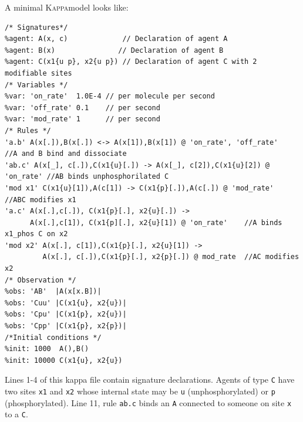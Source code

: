 \documentclass[11pt]{book}
\def\Kappa{\textsc{Kappa}}
\def\ttt#1{\texttt{#1}}
\begin{document}
A minimal \Kappa model looks like:




\begin{lstlisting}[language=kappa]
/* Signatures*/
%agent: A(x, c)             // Declaration of agent A
%agent: B(x)               // Declaration of agent B
%agent: C(x1{u p}, x2{u p}) // Declaration of agent C with 2 modifiable sites
/* Variables */
%var: 'on_rate'  1.0E-4 // per molecule per second
%var: 'off_rate' 0.1    // per second
%var: 'mod_rate' 1      // per second
/* Rules */
'a.b' A(x[.]),B(x[.]) <-> A(x[1]),B(x[1]) @ 'on_rate', 'off_rate'       //A and B bind and dissociate
'ab.c' A(x[_], c[.]),C(x1{u}[.]) -> A(x[_], c[2]),C(x1{u}[2]) @ 'on_rate' //AB binds unphosphorilated C
'mod x1' C(x1{u}[1]),A(c[1]) -> C(x1{p}[.]),A(c[.]) @ 'mod_rate'        //ABC modifies x1
'a.c' A(x[.],c[.]), C(x1{p}[.], x2{u}[.]) ->
      A(x[.],c[1]), C(x1{p][.], x2{u}[1]) @ 'on_rate'    //A binds x1_phos C on x2
'mod x2' A(x[.], c[1]),C(x1{p}[.], x2{u}[1]) ->
         A(x[.], c[.]),C(x1{p}[.], x2{p}[.]) @ mod_rate  //AC modifies x2
/* Observation */
%obs: 'AB'  |A(x[x.B])|
%obs: 'Cuu' |C(x1{u}, x2{u})|
%obs: 'Cpu' |C(x1{p}, x2{u})|
%obs: 'Cpp' |C(x1{p}, x2{p})|
/*Initial conditions */
%init: 1000  A(),B()
%init: 10000 C(x1{u}, x2{u})
\end{lstlisting}

Lines 1-4 of this kappa file contain
signature
declarations. Agents of type
\ttt{C} have two sites \ttt{x1} and \ttt{x2} whose internal state may
be \ttt{u} (unphosphorylated) or \ttt{p} (phosphorylated).
Line 11, rule \ttt{{\textquotesingle}ab.c{\textquotesingle}} binds an
\ttt{A} connected to someone on site \ttt{x} to a \ttt{C}.
\end{document}
